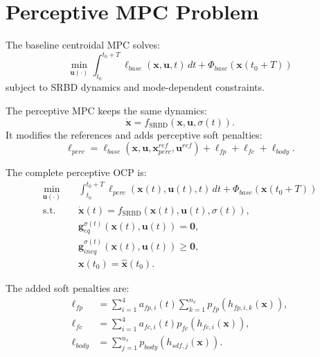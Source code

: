 \documentclass[11pt,a4paper]{article}
\begin{document}

\section{Perceptive MPC Problem}
\label{sec:perceptive_ocp}

The baseline centroidal MPC solves:
\begin{equation}
	\min_{\bm{u}(\cdot)}
	\int_{t_0}^{t_0+T}
	\ell_{base}(\bm{x},\bm{u},t)\,dt
	+
	\Phi_{base}(\bm{x}(t_0+T))
\end{equation}
subject to SRBD dynamics and mode-dependent constraints.

The perceptive MPC keeps the same dynamics:
\begin{equation}
	\dot{\bm{x}}
	=
	f_{\text{SRBD}}(\bm{x},\bm{u},\sigma(t)).
\end{equation}
It modifies the references and adds perceptive soft penalties:
\begin{equation}
	\ell_{perc}
	=
	\ell_{base}
	(\bm{x},\bm{u},\bm{x}^{ref}_{perc},\bm{u}^{ref})
	+
	\ell_{fp}
	+
	\ell_{fc}
	+
	\ell_{body}.
\end{equation}

The complete perceptive OCP is:
\begin{equation}
	\boxed{
		\begin{aligned}
			\min_{\bm{u}(\cdot)}\quad
			&
			\int_{t_0}^{t_0+T}
			\ell_{perc}(\bm{x}(t),\bm{u}(t),t)\,dt
			+
			\Phi_{base}(\bm{x}(t_0+T))\\
			\text{s.t.}\quad
			&
			\dot{\bm{x}}(t)=f_{\text{SRBD}}(\bm{x}(t),\bm{u}(t),\sigma(t)),\\
			&
			\bm{g}_{eq}^{\sigma(t)}(\bm{x}(t),\bm{u}(t))=\bm{0},\\
			&
			\bm{g}_{ineq}^{\sigma(t)}(\bm{x}(t),\bm{u}(t))\geq\bm{0},\\
			&
			\bm{x}(t_0)=\hat{\bm{x}}(t_0).
		\end{aligned}
	}
\end{equation}

The added soft penalties are:
\begin{align}
	\ell_{fp}
	&=
	\sum_{i=1}^{4}
	a_{fp,i}(t)
	\sum_{k=1}^{n_v}
	p_{fp}\!\left(h_{fp,i,k}(\bm{x})\right),\\
	\ell_{fc}
	&=
	\sum_{i=1}^{4}
	a_{fc,i}(t)
	p_{fc}\!\left(h_{fc,i}(\bm{x})\right),\\
	\ell_{body}
	&=
	\sum_{j=1}^{n_s}
	p_{body}\!\left(h_{sdf,j}(\bm{x})\right).
\end{align}
\end{document}
